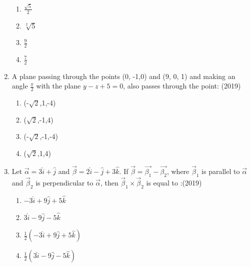 \documentclass[12pt]{article}
\providecommand{\brak}[1]{\ensuremath{\left(#1\right)}}
\begin{document}
\begin{enumerate}
\begin{enumerate}
\item  $\frac{\sqrt{5}}{2}$
\item $\sqrt[2]{5}$
\item $\frac{9}{2}$
\item $\frac{7}{2}$
\end{enumerate}
\item A plane passing through the points (0, -1,0) and (9, 0, 1) and making an angle $\frac{\pi}{2}$ with the plane $y-z+5=0$, also passes through the point: (2019)
\begin{enumerate}
\item (-$\sqrt{2}$,1,-4)
\item ($\sqrt{2}$,-1,4)
\item (-$\sqrt{2}$,-1,-4)
\item ($\sqrt{2}$,1,4)
\end{enumerate}
\item Let $\vec{\alpha}=3\hat{i}+\hat{j}$ and $\vec{\beta}=2\hat{i}-\hat{j}+3\hat{k}$. If $\vec{\beta}=\vec{\beta_1}-\vec{\beta_2}$, where $\vec{\beta}_1$ is parallel to $\vec{\alpha}$ and $\vec{\beta}_2$ is perpendicular to $\vec{\alpha}$, then $\vec{\beta}_1\times\vec{\beta}_2$ is equal to :(2019)
\begin{enumerate}
\item  $-3\hat{i}+9\hat{j}+5\hat{k}$
\item  $3\hat{i}-9\hat{j}-5\hat{k}$
\item  $\frac{1}{2}\brak{-3\hat{i}+9\hat{j}+5\hat{k}}$
\item  $\frac{1}{2}\brak{3\hat{i}-9\hat{j}-5\hat{k}}$
\end{enumerate}

\end{enumerate}
\end{document}
